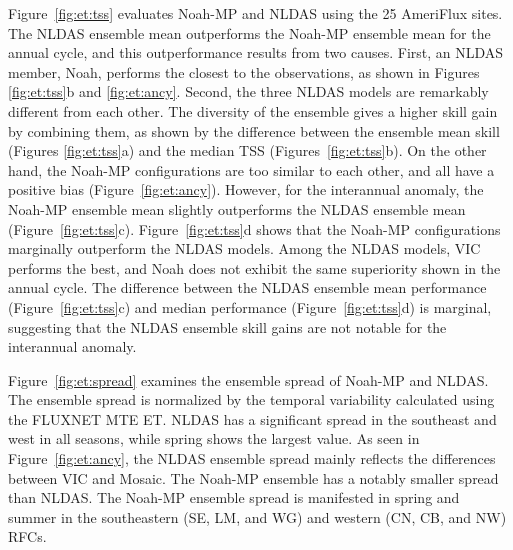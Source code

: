 \documentclass[essd, manuscript]{copernicus}
\begin{document}
Figure~\ref{fig:et:tss} evaluates Noah-MP and NLDAS using the 25 AmeriFlux sites. The NLDAS ensemble mean outperforms the Noah-MP ensemble mean for the annual cycle, and this outperformance results from two causes. First, an NLDAS member, Noah, performs the closest to the observations, as shown in Figures \ref{fig:et:tss}b and \ref{fig:et:ancy}. Second, the three NLDAS models are remarkably different from each other. The diversity of the ensemble gives a higher skill gain by combining them, as shown by the difference between the ensemble mean skill (Figures \ref{fig:et:tss}a) and the median TSS (Figures~\ref{fig:et:tss}b). On the other hand, the Noah-MP configurations are too similar to each other, and all have a positive bias (Figure~\ref{fig:et:ancy}). However, for the interannual anomaly, the Noah-MP ensemble mean slightly outperforms the NLDAS ensemble mean (Figure~\ref{fig:et:tss}c). Figure~\ref{fig:et:tss}d shows that the Noah-MP configurations marginally outperform the NLDAS models. Among the NLDAS models, VIC performs the best, and Noah does not exhibit the same superiority shown in the annual cycle. The difference between the NLDAS ensemble mean performance (Figure~\ref{fig:et:tss}c) and median performance (Figure~\ref{fig:et:tss}d) is marginal, suggesting that the NLDAS ensemble skill gains are not notable for the interannual anomaly.

Figure~\ref{fig:et:spread} examines the ensemble spread of Noah-MP and NLDAS\@. The ensemble spread is normalized by the temporal variability calculated using the FLUXNET MTE ET\@. NLDAS has a significant spread in the southeast and west in all seasons, while spring shows the largest value. As seen in Figure~\ref{fig:et:ancy}, the NLDAS ensemble spread mainly reflects the differences between VIC and Mosaic. The Noah-MP ensemble has a notably smaller spread than NLDAS\@. The Noah-MP ensemble spread is manifested in spring and summer in the southeastern (SE, LM, and WG) and western (CN, CB, and NW) RFCs.
\end{document}
